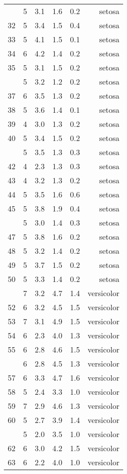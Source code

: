 \documentclass[a4paper, 10pt]{article}\usepackage[]{graphicx}\usepackage[]{color}
\begin{document}
\begin{table}
\begin{longtable}{llcrlr}
\addlinespace
31 & 5 & 3.1 & 1.6 & 0.2 & setosa\\
32 & 5 & 3.4 & 1.5 & 0.4 & setosa\\
33 & 5 & 4.1 & 1.5 & 0.1 & setosa\\
34 & 6 & 4.2 & 1.4 & 0.2 & setosa\\
35 & 5 & 3.1 & 1.5 & 0.2 & setosa\\
\addlinespace
36 & 5 & 3.2 & 1.2 & 0.2 & setosa\\
37 & 6 & 3.5 & 1.3 & 0.2 & setosa\\
38 & 5 & 3.6 & 1.4 & 0.1 & setosa\\
39 & 4 & 3.0 & 1.3 & 0.2 & setosa\\
40 & 5 & 3.4 & 1.5 & 0.2 & setosa\\
\addlinespace
41 & 5 & 3.5 & 1.3 & 0.3 & setosa\\
42 & 4 & 2.3 & 1.3 & 0.3 & setosa\\
43 & 4 & 3.2 & 1.3 & 0.2 & setosa\\
44 & 5 & 3.5 & 1.6 & 0.6 & setosa\\
45 & 5 & 3.8 & 1.9 & 0.4 & setosa\\
\addlinespace
46 & 5 & 3.0 & 1.4 & 0.3 & setosa\\
47 & 5 & 3.8 & 1.6 & 0.2 & setosa\\
48 & 5 & 3.2 & 1.4 & 0.2 & setosa\\
49 & 5 & 3.7 & 1.5 & 0.2 & setosa\\
50 & 5 & 3.3 & 1.4 & 0.2 & setosa\\
\addlinespace
51 & 7 & 3.2 & 4.7 & 1.4 & versicolor\\
52 & 6 & 3.2 & 4.5 & 1.5 & versicolor\\
53 & 7 & 3.1 & 4.9 & 1.5 & versicolor\\
54 & 6 & 2.3 & 4.0 & 1.3 & versicolor\\
55 & 6 & 2.8 & 4.6 & 1.5 & versicolor\\
\addlinespace
56 & 6 & 2.8 & 4.5 & 1.3 & versicolor\\
57 & 6 & 3.3 & 4.7 & 1.6 & versicolor\\
58 & 5 & 2.4 & 3.3 & 1.0 & versicolor\\
59 & 7 & 2.9 & 4.6 & 1.3 & versicolor\\
60 & 5 & 2.7 & 3.9 & 1.4 & versicolor\\
\addlinespace
61 & 5 & 2.0 & 3.5 & 1.0 & versicolor\\
62 & 6 & 3.0 & 4.2 & 1.5 & versicolor\\
63 & 6 & 2.2 & 4.0 & 1.0 & versicolor\\

\end{longtable}
\end{table}
\end{document}
